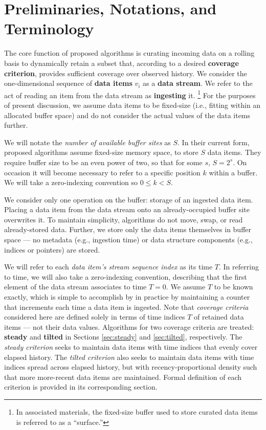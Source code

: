 \section{Preliminaries, Notations, and Terminology} \label{sec:notation}

The core function of proposed algorithms is curating incoming data on a rolling basis to dynamically retain a subset that, according to a desired \textbf{coverage criterion}, provides sufficient coverage over observed history.
We consider the one-dimensional sequence of \textbf{data items} $v_i$ as a \textbf{data stream}.
We refer to the act of reading an item from the data stream as \textbf{ingesting} it.%
\footnote{%
In associated materials, the fixed-size buffer used to store curated data items is referred to as a ``surface.''%
}
For the purposes of present discussion, we assume data items to be fixed-size (i.e., fitting within an allocated buffer space) and do not consider the actual values of the data items further.

We will notate the \textit{number of available buffer sites} as $S$.
In their current form, proposed algorithms assume fixed-size memory space, to store $S$ data items.
They require buffer size to be an even power of two, so that for some $s$, $S = 2^s$.
On occasion it will become necessary to refer to a specific position $k$ within a buffer.
We will take a zero-indexing convention so $0 \leq k < S$.

We consider only one operation on the buffer: storage of an ingested data item.
Placing a data item from the data stream onto an already-occupied buffer site overwrites it.
To maintain simplicity, algorithms do not move, swap, or read already-stored data.
Further, we store only the data items themselves in buffer space --- no metadata (e.g., ingestion time) or data structure components (e.g., indices or pointers) are stored.

We will refer to each \textit{data item's stream sequence index} as its time $T$.
In referring to time, we will also take a zero-indexing convention, describing that the first element of the data stream associates to time $T=0$.
We assume $T$ to be known exactly, which is simple to accomplish by in practice by maintaining a counter that increments each time a data item is ingested.
Note that \textit{coverage criteria} considered here are defined solely in terms of time indices $T$ of retained data items --- not their data values.
Algorithms for two coverage criteria are treated: \textbf{steady} and \textbf{tilted} in Sections \ref{sec:steady} and \ref{sec:tilted}, respectively.
The \textit{steady criterion} seeks to maintain data items with time indices that evenly cover elapsed history.
The \textit{tilted criterion} also seeks to maintain data items with time indices spread across elapsed history, but with recency-proportional density such that more more-recent data items are maintained.
Formal definition of each criterion is provided in its corresponding section.

